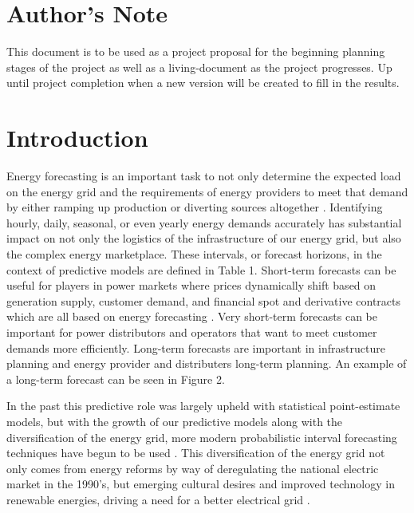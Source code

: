 \documentclass[sigconf]{acmart}
\begin{document}
\maketitle

\section{Author's Note}
This document is to be used as a project proposal for the beginning planning stages of the project as well as a living-document as the project progresses. Up until project completion when a new version will be created to fill in the results.

\section{Introduction}
Energy forecasting is an important task to not only determine the expected load on the energy grid and the requirements of energy providers to meet that demand by either ramping up production or diverting sources altogether \cite{Hong16}. Identifying hourly, daily, seasonal, or even yearly energy demands accurately has substantial impact on not only the logistics of the infrastructure of our energy grid, but also the complex energy marketplace. These intervals, or forecast horizons, in the context of predictive models are defined in Table 1. Short-term forecasts can be useful for players in power markets where prices dynamically shift based on generation supply, customer demand, and financial spot and derivative contracts which are all based on energy forecasting \cite{Bunn04}. Very short-term forecasts can be important for power distributors and operators that want to meet customer demands more efficiently. Long-term forecasts are important in infrastructure planning and energy provider and distributers long-term planning. An example of a long-term forecast can be seen in Figure 2.

In the past this predictive role was largely upheld with statistical point-estimate models, but with the growth of our predictive models along with the diversification of the energy grid, more modern probabilistic interval forecasting techniques have begun to be used \cite{Lee21, Weron14, Hong16}. This diversification of the energy grid not only comes from energy reforms by way of deregulating the national electric market in the 1990's, but emerging cultural desires and improved technology in renewable energies, driving a need for a better electrical grid \cite{Joskow01}.
\end{document}
